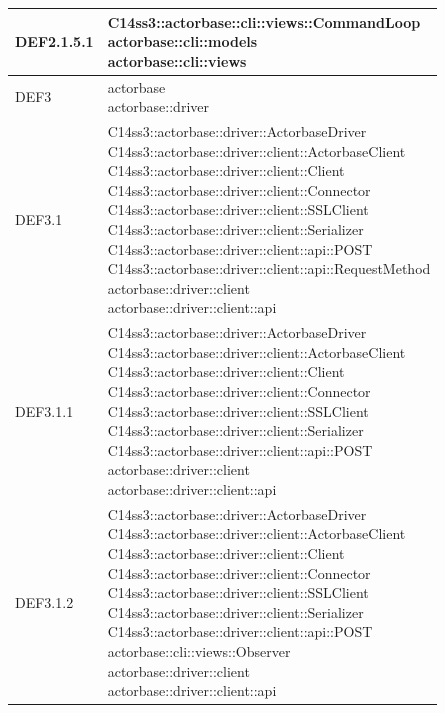 \documentclass{scalatekids-article}
\begin{document}
\begin{longtable}[H]{|p{4.5cm}|p{13cm}|}
\hline
DEF2.1.5.1 & \multiLineCell[t]{C14ss3::actorbase::cli::views::CommandLoop\\actorbase::cli::models\\actorbase::cli::views\\}\\
\hline
DEF3 & \multiLineCell[t]{actorbase\\actorbase::driver\\}\\
\hline
DEF3.1 & \multiLineCell[t]{C14ss3::actorbase::driver::ActorbaseDriver\\C14ss3::actorbase::driver::client::ActorbaseClient\\C14ss3::actorbase::driver::client::Client\\C14ss3::actorbase::driver::client::Connector\\C14ss3::actorbase::driver::client::SSLClient\\C14ss3::actorbase::driver::client::Serializer\\C14ss3::actorbase::driver::client::api::POST\\C14ss3::actorbase::driver::client::api::RequestMethod\\actorbase::driver::client\\actorbase::driver::client::api\\}\\
\hline
DEF3.1.1 & \multiLineCell[t]{C14ss3::actorbase::driver::ActorbaseDriver\\C14ss3::actorbase::driver::client::ActorbaseClient\\C14ss3::actorbase::driver::client::Client\\C14ss3::actorbase::driver::client::Connector\\C14ss3::actorbase::driver::client::SSLClient\\C14ss3::actorbase::driver::client::Serializer\\C14ss3::actorbase::driver::client::api::POST\\actorbase::driver::client\\actorbase::driver::client::api\\}\\
\hline
DEF3.1.2 & \multiLineCell[t]{C14ss3::actorbase::driver::ActorbaseDriver\\C14ss3::actorbase::driver::client::ActorbaseClient\\C14ss3::actorbase::driver::client::Client\\C14ss3::actorbase::driver::client::Connector\\C14ss3::actorbase::driver::client::SSLClient\\C14ss3::actorbase::driver::client::Serializer\\C14ss3::actorbase::driver::client::api::POST\\actorbase::cli::views::Observer\\actorbase::driver::client\\actorbase::driver::client::api\\}\\

\end{longtable}
\end{document}
